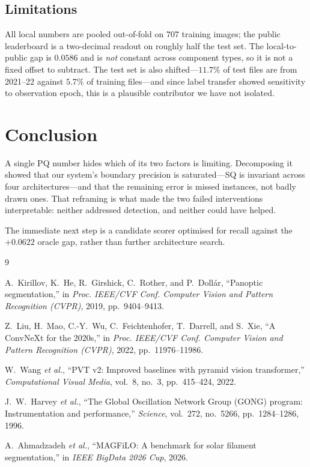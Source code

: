 \documentclass[conference]{IEEEtran}
\begin{document}
\subsection{Limitations}

All local numbers are pooled out-of-fold on $707$ training images; the public
leaderboard is a two-decimal readout on roughly half the test set. The
local-to-public gap is $0.0586$ and is \emph{not} constant across component
types, so it is not a fixed offset to subtract. The test set is also
shifted---$11.7\%$ of test files are from 2021--22 against $5.7\%$ of training
files---and since label transfer showed sensitivity to observation epoch, this
is a plausible contributor we have not isolated.

\section{Conclusion}

A single PQ number hides which of its two factors is limiting. Decomposing it
showed that our system's boundary precision is saturated---SQ is invariant
across four architectures---and that the remaining error is missed instances,
not badly drawn ones. That reframing is what made the two failed interventions
interpretable: neither addressed detection, and neither could have helped.

The immediate next step is a candidate scorer optimised for recall against the
$+0.0622$ oracle gap, rather than further architecture search.

\begin{thebibliography}{9}

A.~Kirillov, K.~He, R.~Girshick, C.~Rother, and P.~Doll\'ar,
``Panoptic segmentation,''
in \emph{Proc. IEEE/CVF Conf. Computer Vision and Pattern Recognition (CVPR)},
2019, pp.~9404--9413.

Z.~Liu, H.~Mao, C.-Y.~Wu, C.~Feichtenhofer, T.~Darrell, and S.~Xie,
``A ConvNeXt for the 2020s,''
in \emph{Proc. IEEE/CVF Conf. Computer Vision and Pattern Recognition (CVPR)},
2022, pp.~11976--11986.

W.~Wang \emph{et al.},
``PVT v2: Improved baselines with pyramid vision transformer,''
\emph{Computational Visual Media}, vol.~8, no.~3, pp.~415--424, 2022.

J.~W.~Harvey \emph{et al.},
``The Global Oscillation Network Group (GONG) program: Instrumentation and
performance,''
\emph{Science}, vol.~272, no.~5266, pp.~1284--1286, 1996.

A.~Ahmadzadeh \emph{et al.},
``MAGFiLO: A benchmark for solar filament segmentation,''
in \emph{IEEE BigData 2026 Cup}, 2026.

\end{thebibliography}
\end{document}
